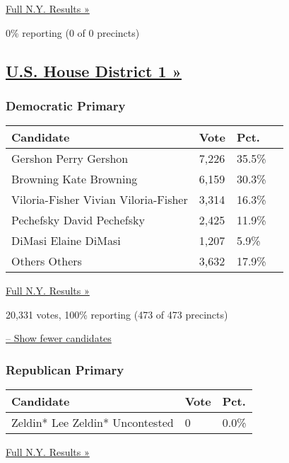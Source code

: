 \href{https://www.nytimes3xbfgragh.onion/elections/results/new-york}{Full
N.Y. Results »}

0\% reporting (0 of 0 precincts)

\hypertarget{us-house-district-1-}{%
\subsection{\texorpdfstring{\href{https://www.nytimes3xbfgragh.onion/elections/results/new-york-house-district-1-primary-election}{U.S.
House District 1
»}}{U.S. House District 1 »}}\label{us-house-district-1-}}

\hypertarget{democratic-primary-1}{%
\subsubsection{Democratic Primary}\label{democratic-primary-1}}

\begin{longtable}[]{@{}llll@{}}
\toprule
Candidate & Vote & Pct. &\tabularnewline
\midrule
\endhead
 Gershon Perry Gershon & 7,226 & 35.5\% &\tabularnewline
 Browning Kate Browning & 6,159 & 30.3\% &\tabularnewline
 Viloria-Fisher Vivian Viloria-Fisher & 3,314 & 16.3\% &\tabularnewline
 Pechefsky David Pechefsky & 2,425 & 11.9\% &\tabularnewline
 DiMasi Elaine DiMasi & 1,207 & 5.9\% &\tabularnewline
 Others Others & 3,632 & 17.9\% &\tabularnewline
\bottomrule
\end{longtable}

\href{https://www.nytimes3xbfgragh.onion/elections/results/new-york}{Full
N.Y. Results »}

20,331 votes, 100\% reporting (473 of 473 precincts)

\protect\hyperlink{}{-- Show fewer candidates}

\hypertarget{republican-primary-1}{%
\subsubsection{Republican Primary}\label{republican-primary-1}}

\begin{longtable}[]{@{}lll@{}}
\toprule
Candidate & Vote & Pct.\tabularnewline
\midrule
\endhead
 Zeldin* Lee Zeldin* Uncontested & 0 & 0.0\%\tabularnewline
\bottomrule
\end{longtable}

\href{https://www.nytimes3xbfgragh.onion/elections/results/new-york}{Full
N.Y. Results »}

